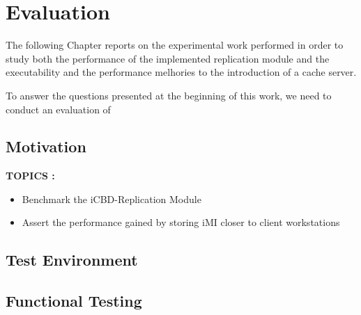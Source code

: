 \chapter{Evaluation}
\label{cha:evaluation}

The following Chapter reports on the experimental work performed in order to study both the performance of the implemented replication module and the executability and the performance melhories to the introduction of a cache server.

To answer the questions presented at the beginning of this work, we need to conduct an evaluation of

\section{Motivation}
\label{sec:motivation}

\textbf{TOPICS :}
\begin{itemize}
	\item Benchmark the iCBD-Replication Module
	\item Assert the performance gained by storing iMI closer to client workstations
\end{itemize}



\section{Test Environment}
\label{sec:test_env}


\section{Functional Testing}
\label{sec:rep_functional_testing}

